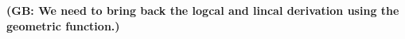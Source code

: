 \documentclass[useAMS,usenatbib]{mn2e}
\newcommand{\bs}{\bmath{s}}
\newcommand{\bJ}{\bmath{J}}
\newcommand{\conj}[1]{\overline{#1}}
\begin{document}
\appendix

{\bf (GB: We need to bring back the logcal and lincal derivation using the geometric function.)}
%
% 
\end{document}
